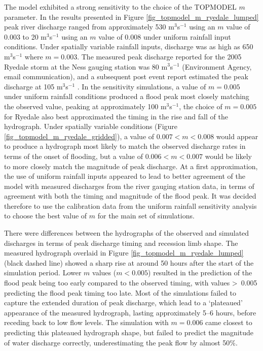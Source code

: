 The model exhibited a strong sensitivity to the choice of the TOPMODEL \(m\) parameter. In the results presented in Figure \ref{fig_topmodel_m_ryedale_lumped} peak river discharge ranged from approximately 530 m\(^3\)s\(^{-1}\) using an \(m\) value of 0.003 to 20 m\(^3\)s\(^{-1}\) using an \(m\) value of 0.008 under uniform rainfall input conditions. Under spatially variable rainfall inputs, discharge was as high as 650 m\(^3\)s\(^{-1}\) where \(m = 0.003\). The measured peak discharge reported for the 2005 Ryedale storm at the Ness gauging station was 80 m\(^3\)s\(^{-1}\) (Environment Agency, email communication), and a subsequent post event report estimated the peak discharge at 105 m\(^3\)s\(^{-1}\) \citep{wass2008investigation}. In the sensitivity simulations, a value of \(m = 0.005\) under uniform rainfall conditions produced a flood peak most closely matching the observed value, peaking at approximately 100 m\(^3\)s\(^{-1}\), the choice of \(m=0.005\) for Ryedale also best approximated the timing in the rise and fall of the hydrograph. Under spatially variable conditions (Figure \ref{fig_topmodel_m_ryedale_gridded}), a value of \(0.007 < m < 0.008\) would appear to produce a hydrograph most likely to match the observed discharge rates in terms of the onset of flooding, but a value of \(0.006 < m < 0.007\) would be likely to more closely match the magnitude of peak discharge. At a first approximation, the use of uniform rainfall inputs appeared to lead to better agreement of the model with measured discharges from the river gauging station data, in terms of agreement with both the timing and magnitude of the flood peak. It was decided therefore to use the calibration data from the uniform rainfall sensitivity analysis to choose the best value of \(m\) for the main set of simulations. 

There were differences between the hydrographs of the observed and simulated discharges in terms of peak discharge timing and recession limb shape. The measured hydrograph overlaid in Figure \ref{fig_topmodel_m_ryedale_lumped} (black dashed line) showed a sharp rise at around 50 hours after the start of the simulation period. Lower \(m\) values (\(m < 0.005\)) resulted in the prediction of the flood peak being too early compared to the observed timing, with values \textgreater \ 0.005 predicting the flood peak timing too late. Most of the simulations failed to capture the extended duration of peak discharge, which lead to a `plateaued' appearance of the measured hydrograph, lasting approximately 5--6 hours, before receding back to low flow levels. The simulation with \(m = 0.006\) came closest to predicting this plateaued hydrograph shape, but failed to predict the magnitude of water discharge correctly, underestimating the peak flow by almost 50\%. 

